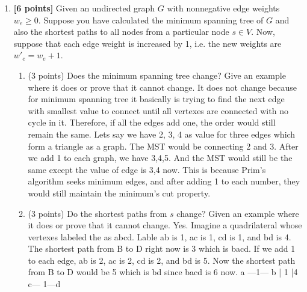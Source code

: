 \documentclass[11pt]{article}
\begin{document}
\begin{enumerate}
\item \textbf{[6 points]} Given an undirected graph $G$ with nonnegative edge weights $w_e \ge 0$.  Suppose you have calculated the minimum spanning tree of $G$ and also the shortest paths to all nodes from a particular node $s \in V$.  Now, suppose that each edge weight is increased by 1, i.e. the new weights are $w'_e = w_e + 1$.

	\begin{enumerate}

	\item (3 points) Does the minimum spanning tree change?  Give an example where it does or prove that it cannot change.
It does not change because for minimum spanning tree it basically is trying to find the next edge with smallest value to connect until all vertexes are connected with no cycle in it. Therefore, if all the edges add one, the order would still remain the same. Lets say we have 2, 3, 4 as value for three edges which form a triangle as a graph. The MST would be connecting 2 and 3. After we add 1 to each graph, we have 3,4,5. And the MST would still be the same except the value of edge is 3,4 now. This is because Prim's algorithm seeks minimum edges, and after adding 1 to each number, they would still maintain the minimum's cut property.

	\item (3 points) Do the shortest paths from $s$ change?  Given an example where it does or prove that it cannot change.
Yes. Imagine a quadrilateral whose vertexes labeled the as abcd. Lable ab is 1, ac is 1, cd is 1, and bd is  4. The shortest path from B to D right now is 3 which is bacd.  If we add 1 to each edge, ab is 2, ac is 2, cd is 2, and bd is  5. Now the shortest path from B to D would be 5 which is bd since bacd is 6 now.
a —1— b
| 1        |4
c— 1—d



	\end{enumerate}

\end{enumerate}
\end{document}
